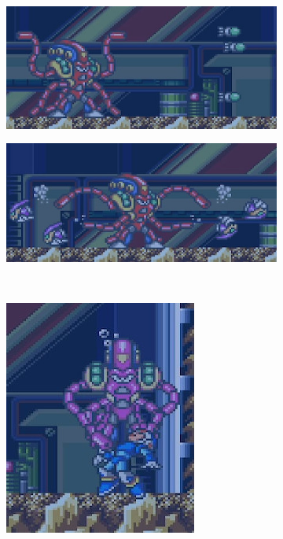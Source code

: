 \begin{figure}[h]
	\centering
	\begin{subfigure}{0.5\textwidth}
		\centering
		\includegraphics[width=\linewidth]{figures/X1/Octopus_missile.jpg}
		\caption{}
	\end{subfigure}
	\begin{subfigure}{0.49\textwidth}
		\centering
		\includegraphics[width=\linewidth]{figures/X1/Octopus_piranha.jpg}
		\caption{}
	\end{subfigure}\\
	\begin{subfigure}{0.5\textwidth}
			\centering
			\includegraphics[width=0.5\linewidth]{figures/X1/Octopus_drain.jpg}
			\caption{}
	\end{subfigure}
	

\end{figure}
